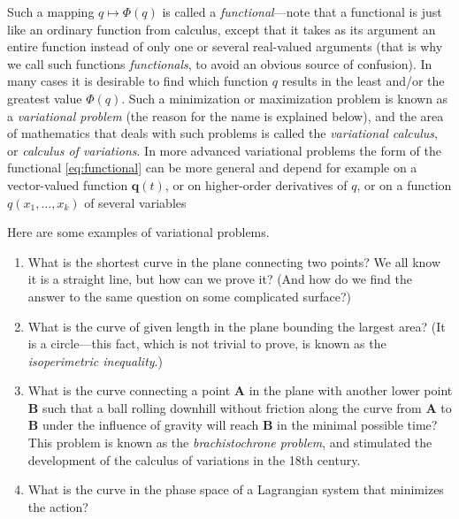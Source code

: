 \documentclass[12pt]{amsart}
\newcounter{example}
\begin{document}
Such a mapping $q\mapsto \Phi(q)$ is called a \emph{functional}---note that a functional is just like an ordinary function from calculus, except that it takes as its argument an entire function instead of only one or several real-valued arguments (that is why we call such functions \emph{functionals}, to avoid an obvious source of confusion). In many cases it is desirable to find which function $q$ results in the least and/or the greatest value $\Phi(q)$. Such a minimization or maximization problem is known as a \emph{variational problem} (the reason for the name is explained below), and the area of mathematics that deals with such problems is called the \emph{variational calculus}, or \emph{calculus of variations}. In more advanced variational problems the form of the functional \eqref{eq:functional} can be more general and depend for example on a vector-valued function $\mathbf{q}(t)$, or on higher-order derivatives of $q$, or on a function $q(x_1,\ldots,x_k)$ of several variables

Here are some examples of variational problems.
\begin{enumerate}
\item What is the shortest curve in the plane connecting two points? We all know it is a straight line, but how can we prove it? (And how do we find the answer to the same question on some complicated surface?)
\item What is the curve of given length in the plane bounding the largest area? (It is a circle---this fact, which is not trivial to prove, is known as the \emph{isoperimetric inequality}.)
\item What is the curve connecting a point $\mathbf{A}$ in the plane with another lower point $\mathbf{B}$ such that a ball rolling downhill without friction along the curve from $\mathbf{A}$ to $\mathbf{B}$ under the influence of gravity will reach $\mathbf{B}$ in the minimal possible time? This problem is known as the \emph{brachistochrone problem}, and stimulated the development of the calculus of variations in the 18th century.
\item What is the curve in the phase space of a Lagrangian system that minimizes the action?
\end{enumerate}
\end{document}

